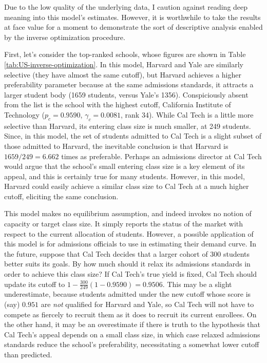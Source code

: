 \documentclass[12pt]{article}
\theoremstyle{definition}
\begin{document}
Due to the low quality of the underlying data, I caution against reading deep meaning into this model's estimates. However, it is worthwhile to take the results at face value for a moment to demonstrate the sort of descriptive analysis enabled by the inverse optimization procedure.

First, let's consider the top-ranked schools, whose figures are shown in Table \ref{tab:US-inverse-optimization}. In this model, Harvard and Yale are similarly selective (they have almost the same cutoff), but Harvard achieves a higher preferability parameter because at the same admissions standards, it attracts a larger student body (1659 students, versus Yale's 1356). Conspiciously absent from the list is the school with the highest cutoff, California Institute of Technology ($p_c = 0.9590$, $\gamma_c = 0.0081$, rank 34). While Cal Tech is a little more selective than Harvard, its entering class size is much smaller, at 249 students. Since, in this model, the set of students admitted to Cal Tech is a slight subset of those admitted to Harvard, the inevitable conclusion is that Harvard is $1659 / 249 = 6.662$ times as preferable. Perhaps an admissions director at Cal Tech would argue that the school's small entering class size is a key element of its appeal, and this is certainly true for many students. However, in this model, Harvard could easily achieve a similar class size to Cal Tech at a much higher cutoff, eliciting the same conclusion.

This model makes no equilibrium assumption, and indeed invokes no notion of capacity or target class size. It simply reports the status of the market with respect to the current allocation of students. However, a possible application of this model is for admissions officials to use in estimating their demand curve. In the future, suppose that Cal Tech decides that a larger cohort of 300 students better suits its goals. By how much should it relax its admissions standards in order to achieve this class size? If Cal Tech's true yield is fixed, Cal Tech should update its cutoff to $1 - \frac{300}{249}(1 - 0.9590) = 0.9506$. This may be a slight underestimate, because students admitted under the new cutoff whose score is (say) $0.951$ are \emph{not} qualified for Harvard and Yale, so Cal Tech will not have to compete as fiercely to recruit them as it does to recruit its current enrollees. On the other hand, it may be an overestimate if there is truth to the hypothesis that Cal Tech's appeal depends on a small class size, in which case relaxed admissions standards reduce the school's preferability, necessitating a somewhat lower cutoff than predicted.
\end{document}
